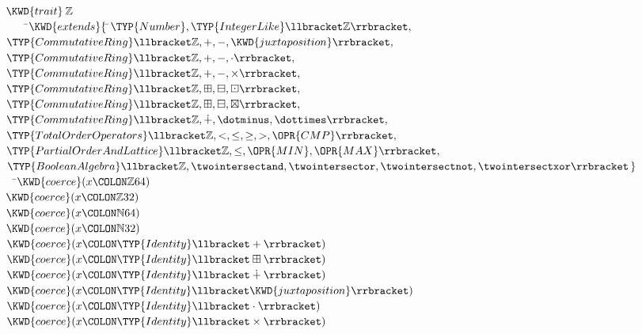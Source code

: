 \begin{Fortress}
\(\KWD{trait}\mskip 4mu plus 4mu\mathbb{Z}\)\\
{\tt~~~~}\pushtabs\=\+\(    \KWD{extends} \{\, \null\)\pushtabs\=\+\(\TYP{Number}, \TYP{IntegerLike}\llbracket\mathbb{Z}\rrbracket,\)\\
\(              \TYP{CommutativeRing}\llbracket\mathbb{Z},+,-,\KWD{juxtaposition}\rrbracket,\)\\
\(              \TYP{CommutativeRing}\llbracket\mathbb{Z},+,-,\cdot\rrbracket,\)\\
\(              \TYP{CommutativeRing}\llbracket\mathbb{Z},+,-,\times\rrbracket,\)\\
\(              \TYP{CommutativeRing}\llbracket\mathbb{Z},\boxplus,\boxminus,\boxdot\rrbracket,\)\\
\(              \TYP{CommutativeRing}\llbracket\mathbb{Z},\boxplus,\boxminus,\boxtimes\rrbracket,\)\\
\(              \TYP{CommutativeRing}\llbracket\mathbb{Z},\dotplus,\dotminus,\dottimes\rrbracket,\)\\
\(              \TYP{TotalOrderOperators}\llbracket\mathbb{Z},<,\leq,\geq,>,\OPR{CMP}\rrbracket,\)\\
\(              \TYP{PartialOrderAndLattice}\llbracket\mathbb{Z},\leq,\OPR{MIN},\OPR{MAX}\rrbracket,\)\\
\(              \TYP{BooleanAlgebra}\llbracket\mathbb{Z},\twointersectand,\twointersector,\twointersectnot,\twointersectxor\rrbracket\,\}\)\-\-\\\poptabs\poptabs
{\tt~~}\pushtabs\=\+\(  \KWD{coerce}(x\COLON \mathbb{Z}64)\)\\
\(  \KWD{coerce}(x\COLON \mathbb{Z}32)\)\\
\(  \KWD{coerce}(x\COLON \mathbb{N}64)\)\\
\(  \KWD{coerce}(x\COLON \mathbb{N}32)\)\\
\(  \KWD{coerce}(x\COLON \TYP{Identity}\llbracket+\rrbracket)\)\\
\(  \KWD{coerce}(x\COLON \TYP{Identity}\llbracket\boxplus\rrbracket)\)\\
\(  \KWD{coerce}(x\COLON \TYP{Identity}\llbracket\dotplus\rrbracket)\)\\
\(  \KWD{coerce}(x\COLON \TYP{Identity}\llbracket\KWD{juxtaposition}\rrbracket)\)\\
\(  \KWD{coerce}(x\COLON \TYP{Identity}\llbracket\cdot\rrbracket)\)\\
\(  \KWD{coerce}(x\COLON \TYP{Identity}\llbracket\times\rrbracket)\)\\

\end{Fortress}
